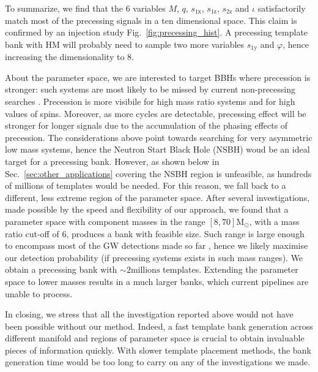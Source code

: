 \documentclass[twocolumn,showpacs,preprintnumbers,nofootinbib,prd,
superscriptaddress,10pt]{revtex4-2}
\begin{document}
To summarize, we find that the $6$ variables $M$, $q$, $s_\text{1x}$, $s_\text{1z}$, $s_\text{2z}$ and $\iota$ satisfactorily match most of the precessing signals in a ten dimensional space.
This claim is confirmed by an injection study Fig.~\ref{fig:precessing_hist}.
A precessing template bank with HM will probably need to sample two more variables $s_\text{1y}$ and $\varphi$, hence increasing the dimensionality to $8$.

About the parameter space, we are interested to target BBHs where precession is stronger: such systems are most likely to be missed by current non-precessing searches \cite{}.
Precession is more visibile for high mass ratio systems and for high values of spins. Moreover, as more cycles are detectable, precessing effect will be stronger for longer signals due to the accumulation of the phasing effects of precession.
The considerations above point towards searching for very asymmetric low mass systems, hence the Neutron Start Black Hole (NSBH) woud be an ideal target for a precessing bank. However, as shown below in Sec.~\ref{sec:other_applications} covering the NSBH region is unfeasible, as hundreds of millions of templates would be needed.
For this reason, we fall back to a different, less extreme region of the parameter space. After several investigations, made possible by the speed and flexibility of our approach, we found that a parameter space with component masses in the range $[8, 70] \mathrm{M_\odot}$, with a mass ratio cut-off of $6$, produces a bank with feasible size.
Such range is large enough to encompass most of the GW detections made so far \cite{LIGOScientific:2020kqk, KAGRA:2021duu}, hence we likely maximise our detection probability (if precessing systems exists in such mass ranges).
We obtain a precessing bank with $\sim 2 \text{millions}$ templates. Extending the parameter space to lower masses results in a much larger banks, which current pipelines are unable to process.

In closing, we stress that all the investigation reported above would not have been possible without our method. Indeed, a fast template bank generation across different manifold and regions of parameter space is crucial to obtain invaluable pieces of information quickly. With slower template placement methods, the bank generation time would be too long to carry on any of the investigations we made.
\end{document}
